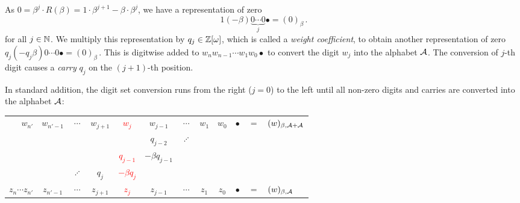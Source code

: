  
As $0=\beta^{j} \cdot R(\beta)=1\cdot \beta^{j+1} -\beta \cdot \beta^{j}$, we have a representation of zero 
$$1 (-\!\beta) \underbrace{0 \cdots 0}_{j}\bullet = (0)_\beta\,. $$
for all $j \in \mathbb{N}$. We multiply this representation by $q_j \in \mathbb{Z}[\omega]$, which is called a \emph{weight coefficient}, to obtain another  representation of zero 
$q_j (-q_j\beta) 0 \cdots 0\bullet = (0)_\beta\,. $
This is digitwise added to $w_{n} w_{n-1}\cdots w_1 w_0 \bullet$ to convert the digit $w_j$ into the alphabet $\mathcal{A}$. The conversion of $j$-th digit causes a \emph{carry} $q_{j}$ on the $(j+1)$-th position. 

In standard addition, the digit set conversion runs from the right ($j=0$) to the left until all non-zero digits and carries are converted into the alphabet $\mathcal{A}$:

	\begin{tabular}{rcccccccclcl}
	$w_{n'}$ & $w_{{n'}-1}$ & $\cdots$ & $w_{j+1}$ &\textcolor{red}{$w_{j}$} &$w_{j-1}$ & $\cdots$ & $w_1$ &$w_0$ &$\bullet$ & $=$&$(w)_{\beta,{\mathcal{A}+\mathcal{A}}}$\\
	  &   & &   &  &$q_{j-2}$ & $\iddots$ &  &  &\\
	   &   & &   & \textcolor{red}{$q_{j-1}$}  & $-\beta q_{j-1}$ &  &  &  &\\
	  &   &  $\iddots$&  $q_{j}$ &  \textcolor{red}{$-\beta q_{j}$} & & &  &  &\\ \cline{1-10}
	$z_{n} \cdots z_{n'}$ & $z_{{n'}-1}$ & $\cdots$ & $z_{j+1}$ &\textcolor{red}{$z_{j}$} &$z_{j-1}$ & $\cdots$ & $z_1$ &$z_0$ &$\bullet$  & $=$&$(w)_{\beta,{\mathcal{A}}}$\\
	\end{tabular}


